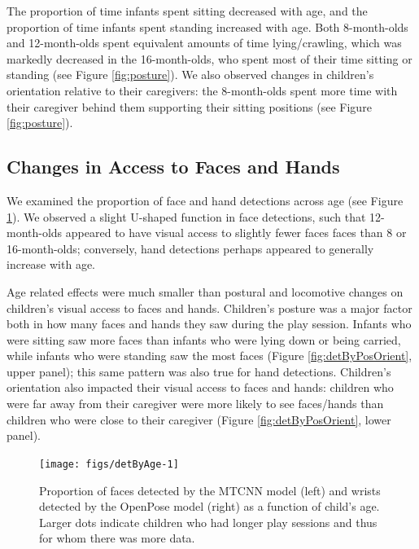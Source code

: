 \documentclass[10pt, letterpaper]{article}
\newenvironment{CodeChunk}{}{}
\begin{document}
The proportion of time infants spent sitting decreased with age, and the
proportion of time infants spent standing increased with age. Both
8-month-olds and 12-month-olds spent equivalent amounts of time
lying/crawling, which was markedly decreased in the 16-month-olds, who
spent most of their time sitting or standing (see Figure
\ref{fig:posture}). We also observed changes in children's orientation
relative to their caregivers: the 8-month-olds spent more time with
their caregiver behind them supporting their sitting positions (see
Figure \ref{fig:posture}).

\subsection{Changes in Access to Faces and
Hands}\label{changes-in-access-to-faces-and-hands}

We examined the proportion of face and hand detections across age (see
Figure \ref{fig:detByAge}). We observed a slight U-shaped function in
face detections, such that 12-month-olds appeared to have visual access
to slightly fewer faces faces than 8 or 16-month-olds; conversely, hand
detections perhaps appeared to generally increase with age.

Age related effects were much smaller than postural and locomotive
changes on children's visual access to faces and hands. Children's
posture was a major factor both in how many faces and hands they saw
during the play session. Infants who were sitting saw more faces than
infants who were lying down or being carried, while infants who were
standing saw the most faces (Figure \ref{fig:detByPosOrient}, upper
panel); this same pattern was also true for hand detections. Children's
orientation also impacted their visual access to faces and hands:
children who were far away from their caregiver were more likely to see
faces/hands than children who were close to their caregiver (Figure
\ref{fig:detByPosOrient}, lower panel).

\begin{CodeChunk}
\begin{figure}[h]

{\centering \texttt{[image: figs/detByAge-1]} 

}

\caption[Proportion of faces detected by the MTCNN model (left) and wrists detected by the OpenPose model (right) as a function of child's age]{Proportion of faces detected by the MTCNN model (left) and wrists detected by the OpenPose model (right) as a function of child's age. Larger dots indicate children who had longer play sessions and thus for whom there was more data.}\label{fig:detByAge}
\end{figure}
\end{CodeChunk}
\end{document}
